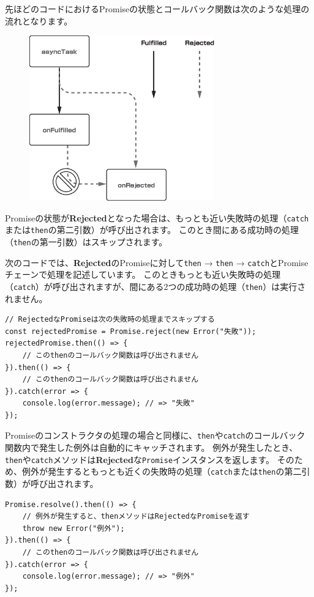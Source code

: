 先ほどのコードにおけるPromiseの状態とコールバック関数は次のような処理の流れとなります。

\begin{figure}[h]
\centering
\includegraphics[width=80mm]{fig/promise-chain.eps}
\end{figure}

Promiseの状態が\textbf{Rejected}となった場合は、もっとも近い失敗時の処理（\texttt{catch}または\texttt{then}の第二引数）が呼び出されます。
このとき間にある成功時の処理（\texttt{then}の第一引数）はスキップされます。

次のコードでは、\textbf{Rejected}のPromiseに対して\texttt{then} → \texttt{then} → \texttt{catch}とPromiseチェーンで処理を記述しています。
このときもっとも近い失敗時の処理（\texttt{catch}）が呼び出されますが、間にある2つの成功時の処理（\texttt{then}）は実行されません。

\begin{lstlisting}
// RejectedなPromiseは次の失敗時の処理までスキップする
const rejectedPromise = Promise.reject(new Error("失敗"));
rejectedPromise.then(() => {
    // このthenのコールバック関数は呼び出されません
}).then(() => {
    // このthenのコールバック関数は呼び出されません
}).catch(error => {
    console.log(error.message); // => "失敗"
});
\end{lstlisting}

Promiseのコンストラクタの処理の場合と同様に、\texttt{then}や\texttt{catch}のコールバック関数内で発生した例外は自動的にキャッチされます。
例外が発生したとき、\texttt{then}や\texttt{catch}メソッドは\textbf{Rejected}な\texttt{Promise}インスタンスを返します。
そのため、例外が発生するともっとも近くの失敗時の処理（\texttt{catch}または\texttt{then}の第二引数）が呼び出されます。

\begin{lstlisting}
Promise.resolve().then(() => { 
    // 例外が発生すると、thenメソッドはRejectedなPromiseを返す
    throw new Error("例外");
}).then(() => {
    // このthenのコールバック関数は呼び出されません
}).catch(error => {
    console.log(error.message); // => "例外"
});
\end{lstlisting}

